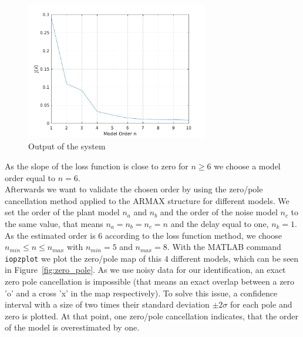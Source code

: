 \documentclass{scrartcl}
\begin{document}
\begin{figure}[h]
	\centering
	\includegraphics[height=6cm]{figures/Loss_fcn.pdf}
	\caption{Output of the system}\label{fig:loss_fcn}
\end{figure}

As the slope of the loss function is close to zero for $n \geq 6 $ we choose a model order equal to $n = 6.$ \\

Afterwards we want to validate the chosen order by using the zero/pole cancellation method applied to the ARMAX structure for different models. 
We set the order of the plant model $n_a$ and $n_b$ and the order of the noise model $n_c$ to the same value, that means $n_a = n_b = n_c = n $ and the delay equal to one, $n_k = 1$. 
As the estimated order is $6$ according to the loss function method, we choose $ n_{min} \leq n \leq n_{max}$ with $ n_{min} = 5$ and $n_{max}=8$. With the MATLAB command \texttt{iopzplot} we plot the zero/pole map of this $4$ different models, which can be seen in Figure~\ref{fig:zero_pole}. 
As we use noisy data for our identification, an exact zero pole cancellation is impossible (that means an exact overlap between a zero 'o' and a cross 'x' in the map respectively). To solve this issue, a confidence interval with a size of two times their standard deviation $\pm 2 \sigma$ for each pole and zero is plotted. At that point, one zero/pole cancellation indicates, that the order of the model is overestimated by one. 
\end{document}
